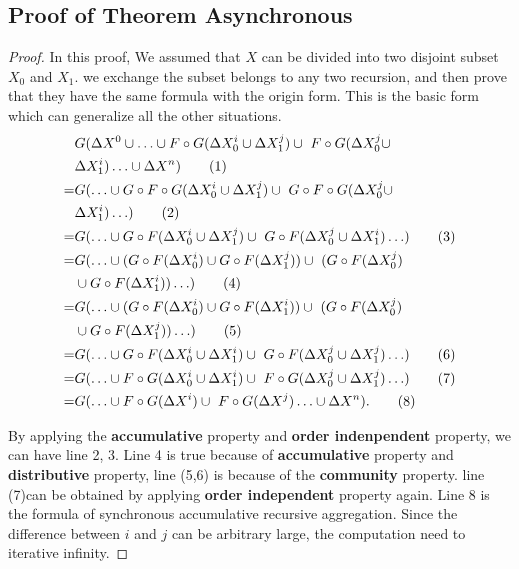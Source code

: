 \begin{appendix}
\subsection{Proof of Theorem Asynchronous}
 \begin{proof}
 \label{sec:app:proof:correct}
 In this proof, We assumed that $X$ can be divided into two disjoint subset $X_0$ and $X_1$. we exchange the subset belongs to any two  recursion, and then prove that they have the same formula with the origin form. This is the basic form which can generalize all the other situations.
 \begin{align}
 &G(\Delta X^0\cup \ldots \cup F\circ G(\Delta X^{i}_0 \cup \Delta X^{j}_1)\cup\ F\circ G(\Delta X^{j}_0 \cup \notag\\ &\Delta X^{i}_1) \ldots\cup \Delta X^n)\tag{1} \\
 =&G( \ldots \cup G \circ F\circ G(\Delta X^{i}_0 \cup \Delta X^{{j}}_1)\cup\ G \circ F\circ G(\Delta X^{{j}}_0 \cup \notag\\ &\Delta X^{i}_1) \ldots)\tag{2} \\
 =&G( \ldots \cup G \circ F(\Delta X^{i}_0 \cup \Delta X^{{j}}_1)\cup\ G \circ F(\Delta X^{{j}}_0 \cup \Delta X^{{i}}_1) \ldots)\tag{3} \\
  =&G( \ldots \cup (G\circ F(\Delta X^{i}_0) \cup G\circ F(\Delta X^{{j}}_1))\cup\ (G \circ F(\Delta X^{{j}}_0) \notag\\ &\cup G \circ F(\Delta X^{i}_1)) \ldots )\tag{4} \\
  =&G( \ldots \cup (G\circ F(\Delta X^{i}_0) \cup G\circ F(\Delta X^{i}_1))\cup\ (G \circ F(\Delta X^{{j}}_0) \notag\\ &\cup G  \circ F(\Delta X^{{j}}_1)) \ldots )\tag{5} \\
  =&G( \ldots \cup G \circ F(\Delta X^{i}_0 \cup \Delta X^{{i}}_1)\cup\ G \circ F(\Delta X^{{j}}_0 \cup \Delta X^{{j}}_1) \ldots)\tag{6} \\
  =&G( \ldots \cup F \circ G(\Delta X^{i}_0 \cup \Delta X^{{i}}_1)\cup\ F \circ G(\Delta X^{{j}}_0 \cup \Delta X^{{j}}_1) \ldots)\tag{7} \\
=&G(\ldots \cup F \circ G(\Delta X^i)\cup\ F \circ G(\Delta X^{j}) \ldots\cup \Delta X^n).\tag{8}
 \end{align}

By applying the \textbf{accumulative} property and \textbf{order indenpendent} property, we can have line 2, 3. Line 4 is true because of \textbf{accumulative} property
and \textbf{distributive} property, line (5,6) is because of the \textbf{community} property. line (7)can be obtained by applying \textbf{order independent} property again.
Line 8 is the formula of synchronous accumulative recursive aggregation. Since the difference between $i$ and $j$ can be arbitrary large, the computation need to iterative infinity.
 \end{proof}

\end{appendix}
